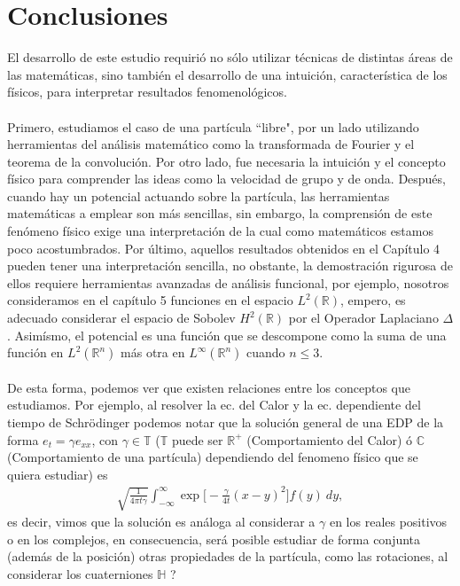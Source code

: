 \documentclass[12pt]{article}
\theoremstyle{definition}
\newcommand*{\field}[1]{\mathbb{#1}}
\begin{document}
\section{Conclusiones}
\noindent
El desarrollo de este estudio requirió no sólo utilizar técnicas de distintas áreas de las matemáticas, sino también el desarrollo de una intuición, característica de los físicos, para interpretar resultados fenomenológicos. \\ \\
Primero, estudiamos el caso de una partícula ``libre", por un lado utilizando herramientas del análisis matemático como la transformada de Fourier y el teorema de la convolución. Por otro lado, fue necesaria la intuición y el concepto físico para comprender las ideas como la velocidad de grupo y de onda. Después, cuando hay un potencial actuando sobre la partícula, las herramientas matemáticas a emplear son más sencillas, sin embargo, la comprensión de este fenómeno físico exige una interpretación de la cual como matemáticos estamos poco acostumbrados. Por último, aquellos resultados obtenidos en el Capítulo 4 pueden tener una interpretación sencilla, no obstante, la demostración rigurosa de ellos requiere herramientas avanzadas de análisis funcional, por ejemplo, nosotros consideramos en el capítulo 5 funciones en el espacio $L^2(\field{R})$, empero, es adecuado considerar el espacio de Sobolev $H^2(\field{R})$ por el Operador Laplaciano $\Delta$. Asimísmo, el potencial es una función que se descompone como la suma de una función en $L^2(\field{R}^n)$ más otra en $L^\infty(\field{R}^n)$ cuando $n\leq 3$.
\\ \\
De esta forma, podemos ver que existen relaciones entre los conceptos que estudiamos. Por ejemplo, al resolver la ec. del Calor y la ec. dependiente del tiempo de Schrödinger podemos notar que la solución general de una EDP de la forma $e_{t}=\gamma e_{xx}$, con $\gamma\in\field{T}$ ($\field{T}$ puede ser $\field{R}^+$ (Comportamiento del Calor) ó $\field{C}$ (Comportamiento de una partícula) dependiendo del fenomeno físico que se quiera estudiar) es
\begin{align*}
    \sqrt{\frac{1}{4\pi t\gamma}}\int_{-\infty}^{\infty}\exp\bigg[-\frac{\gamma}{4t}(x-y)^2\bigg]f(y)\: dy,
\end{align*}
es decir, vimos que la solución es análoga al considerar a $\gamma$ en los reales positivos o en los complejos, en consecuencia, será posible estudiar de forma conjunta (además de la posición) otras propiedades de la partícula, como las rotaciones, al considerar los cuaterniones $\field{H}$ ?
\end{document}
